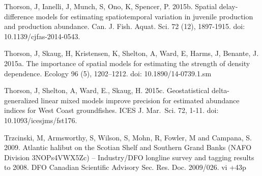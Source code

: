 \documentclass[12pt]{article}\usepackage[]{graphicx}\usepackage[]{color}
\begin{document}
\begin{appendices}
Thorson, J, Ianelli, J, Munch, S, Ono, K, Spencer, P. 2015b. Spatial delay-difference models for estimating spatiotemporal variation in juvenile production and production abundance. Can. J. Fish. Aquat. Sci. 72 (12), 1897-1915. doi: 10.1139/cjfas-2014-0543.

Thorson, J, Skaug, H, Kristensen, K, Shelton, A, Ward, E, Harms, J, Benante, J. 2015a. The importance of spatial models for estimating the strength of density dependence. Ecology 96 (5), 1202--1212. doi: 10.1890/14-0739.1.sm

Thorson, J, Shelton, A, Ward, E., Skaug, H. 2015c. Geostatistical delta-generalized linear mixed models improve precision for estimated abundance indices for West Coast groundfishes. ICES J. Mar.~Sci. 72, 1-11. doi: 10.1093/icesjms/fst176.

Trzcinski, M, Armsworthy, S, Wilson, S, Mohn, R, Fowler, M and Campana, S. 2009. Atlantic halibut on the Scotian Shelf and Southern Grand Banks (NAFO Division 3NOPs4VWX5Zc) -- Industry/DFO longline survey and tagging results to 2008. DFO Canadian Scientific Advisory Sec. Res. Doc. 2009/026. vi +43p

\clearpage

\section{}
\label{app:second-appendix}
\begin{figure}[htb]

{\centering {} 

}
\end{figure}
\end{appendices}
\end{document}
